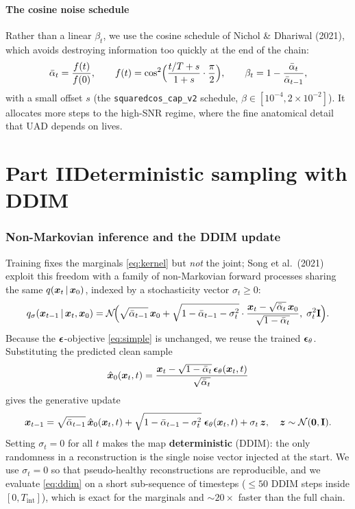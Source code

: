 \subsection{The cosine noise schedule}
Rather than a linear $\beta_t$, we use the cosine schedule of Nichol \& Dhariwal
(2021), which avoids destroying information too quickly at the end of the chain:
\begin{equation}
\bar{\alpha}_t=\frac{f(t)}{f(0)},\qquad f(t)=\cos^2\!\Big(\frac{t/T+s}{1+s}\cdot\frac{\pi}{2}\Big),
\qquad \beta_t=1-\frac{\bar{\alpha}_t}{\bar{\alpha}_{t-1}},
\label{eq:cosine}
\end{equation}
with a small offset $s$ (the \texttt{squaredcos\_cap\_v2} schedule,
$\beta\in[10^{-4},2\!\times\!10^{-2}]$). It allocates more steps to the
high-SNR regime, where the fine anatomical detail that UAD depends on lives.

\part*{Part II\quad Deterministic sampling with DDIM}
\label{part:ddim}

\section{Non-Markovian inference and the DDIM update}
Training fixes the marginals \eqref{eq:kernel} but \emph{not} the joint; Song et
al.\ (2021) exploit this freedom with a family of non-Markovian forward
processes sharing the same $q(\bm{x}_t\,\vert\,\bm{x}_0)$, indexed by a stochasticity vector
$\sigma_t\ge0$:
\begin{equation}
q_\sigma(\bm{x}_{t-1}\,\vert\,\bm{x}_t,\bm{x}_0)=\mathcal{N}\!\Big(\sqrt{\bar{\alpha}_{t-1}}\,\bm{x}_0
+\sqrt{1-\bar{\alpha}_{t-1}-\sigma_t^2}\cdot\frac{\bm{x}_t-\sqrt{\bar{\alpha}_t}\,\bm{x}_0}{\sqrt{1-\bar{\alpha}_t}},\;\sigma_t^2\mathbf{I}\Big).
\end{equation}
Because the $\bm{\epsilon}$-objective \eqref{eq:simple} is unchanged, we reuse the trained
$\bm{\epsilon}_\theta$. Substituting the predicted clean sample
\begin{equation}
\hat{\bm{x}}_0(\bm{x}_t,t)=\frac{\bm{x}_t-\sqrt{1-\bar{\alpha}_t}\,\bm{\epsilon}_\theta(\bm{x}_t,t)}{\sqrt{\bar{\alpha}_t}}
\label{eq:x0hat}
\end{equation}
gives the generative update
\begin{equation}
\bm{x}_{t-1}=\sqrt{\bar{\alpha}_{t-1}}\,\hat{\bm{x}}_0(\bm{x}_t,t)
+\sqrt{1-\bar{\alpha}_{t-1}-\sigma_t^2}\;\bm{\epsilon}_\theta(\bm{x}_t,t)+\sigma_t\,\bm{z},\quad \bm{z}\sim\mathcal{N}(\bm0,\mathbf{I}).
\label{eq:ddim}
\end{equation}
Setting $\sigma_t=0$ for all $t$ makes the map \textbf{deterministic} (DDIM): the
only randomness in a reconstruction is the single noise vector injected at the
start. We use $\sigma_t=0$ so that pseudo-healthy reconstructions are
reproducible, and we evaluate \eqref{eq:ddim} on a short sub-sequence of
timesteps ($\le 50$ DDIM steps inside $[0,T_{\text{int}}]$), which is exact for the
marginals and $\sim\!20\times$ faster than the full chain.

